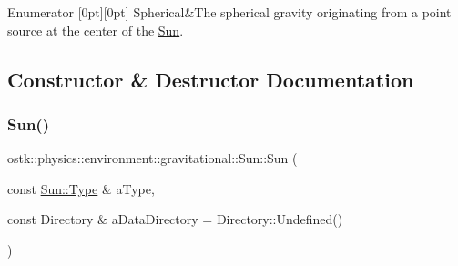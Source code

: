 \begin{DoxyEnumFields}{Enumerator}
[0pt][0pt]{}\mbox{\label{classostk_1_1physics_1_1environment_1_1gravitational_1_1_sun_ae567145f71c7750a9e4e43a309bd19dba24e5c24fabd1c081d4c729094df0b947}} 
Spherical&The spherical gravity originating from a point source at the center of the \hyperlink{classostk_1_1physics_1_1environment_1_1gravitational_1_1_sun}{Sun}. \\
\hline

\end{DoxyEnumFields}


\subsection{Constructor \& Destructor Documentation}
\mbox{\label{classostk_1_1physics_1_1environment_1_1gravitational_1_1_sun_a7ddf138affec0ef4b739bfa508ecfbbf}} 
\subsubsection{\texorpdfstring{Sun()}{Sun()}\hspace{0.1cm}{\footnotesize\ttfamily [1/2]}}
{\footnotesize\ttfamily ostk\+::physics\+::environment\+::gravitational\+::\+Sun\+::\+Sun (\begin{DoxyParamCaption}\item[{const \hyperlink{classostk_1_1physics_1_1environment_1_1gravitational_1_1_sun_ae567145f71c7750a9e4e43a309bd19db}{Sun\+::\+Type} \&}]{a\+Type,  }\item[{const Directory \&}]{a\+Data\+Directory = {\ttfamily Directory\+:\+:Undefined()} }\end{DoxyParamCaption})}



